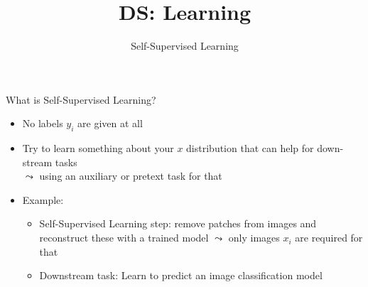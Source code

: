 \documentclass[aspectratio=169]{../latex_main/tntbeamer}  %
\title[Self-Supervised Learning]{DS: Learning}
\subtitle{Self-Supervised Learning}
\begin{document}
	
    \maketitle
    
    \begin{frame}[c]{What is Self-Supervised Learning?}

        \begin{itemize}
            \item No labels $y_i$ are given at all
            \item Try to learn something about your $x$ distribution that can help for down-stream tasks\\ $\leadsto$ using an auxiliary or pretext task for that
            \item Example:
            \begin{itemize}
                \item Self-Supervised Learning step: remove patches from images and reconstruct these with a trained model $\leadsto$ only images $x_i$ are required for that
                \item Downstream task: Learn to predict an image classification model
            \end{itemize}
        \end{itemize}

    \end{frame}
\end{document}

